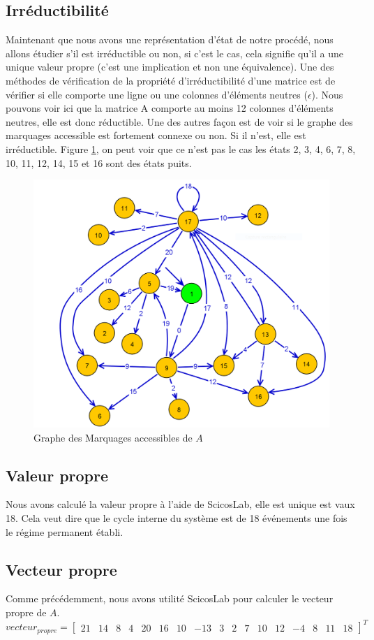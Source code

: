 \subsection{Irréductibilité}
Maintenant que nous avons une représentation d'état de notre procédé, nous allons étudier s'il est irréductible ou non, si c'est le cas, cela signifie qu'il a une unique valeur propre (c'est une implication et non une équivalence). Une des méthodes de vérification de la propriété d'irréductibilité d'une matrice est de vérifier si elle comporte une ligne ou une colonnes d'éléments neutres ($\epsilon$).
Nous pouvons voir ici que la matrice A comporte au moins 12 colonnes d'éléments neutres, elle est donc réductible. Une des autres façon est de voir si le graphe des marquages accessible est fortement connexe ou non. Si il n'est, elle est irréductible. Figure \ref{fig:gma_train}, on peut voir que ce n'est pas le cas les états 2, 3, 4, 6, 7, 8, 10, 11, 12, 14, 15 et 16 sont des états puits.
\begin{figure}[!ht]
\centering
\includegraphics[width = .4\textwidth]{./I/images/GMA.png}
\caption{\label{fig:gma_train} Graphe des Marquages accessibles de $A$}
\end{figure}
\subsection{Valeur propre}
Nous avons calculé la valeur propre à l'aide de ScicosLab, elle est unique est vaux 18. Cela veut dire que le cycle interne du système est de 18 événements une fois le régime permanent établi.
\subsection{Vecteur propre}
Comme précédemment, nous avons utilité ScicosLab pour calculer le vecteur propre de $A$.
\begin{equation}
vecteur_{propre} = 
\left[
\begin{array}{ccccccccccccccccc}
21 & 14 & 8 & 4 & 20 & 16 & 10 & -13 & 3 & 2 & 7 & 10 & 12 & -4 & 8 & 11 & 18	
\end{array} \right]^T
\end{equation}

